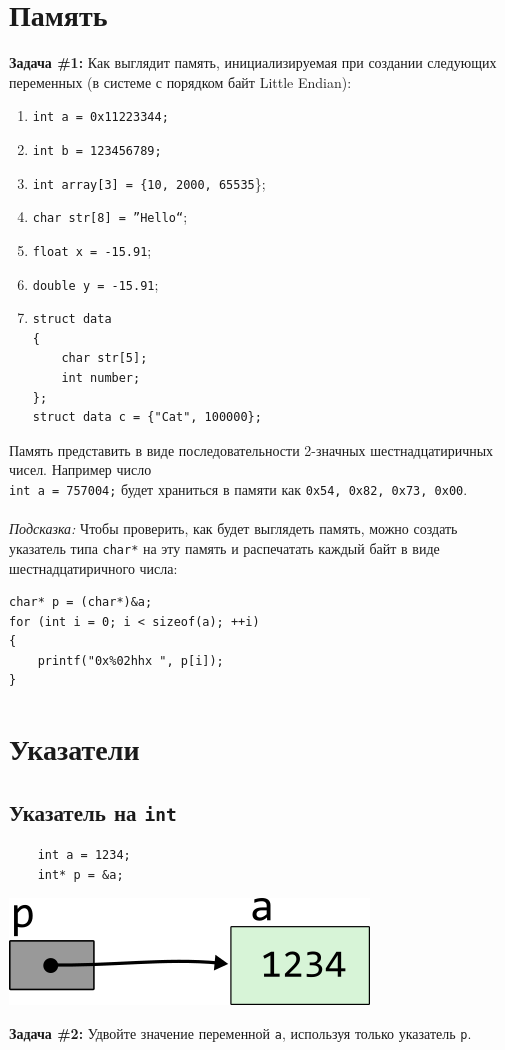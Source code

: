 \documentclass{article}
\begin{document}
\section*{Память}
\textbf{Задача \#1:} Как выглядит память, инициализируемая при создании следующих переменных (в системе с порядком байт Little Endian):
\begin{multicols}{2}
\begin{enumerate}
\item \texttt{int a = 0x11223344;}
\item \texttt{int b = 123456789;}
\item \texttt{int array[3] = \{10, 2000, 65535}\};
\item \texttt{char str[8] = ''Hello``};
\item \texttt{float x = -15.91};
\item \texttt{double y = -15.91};
\item
\begin{verbatim}
struct data
{
    char str[5];
    int number;
};
struct data c = {"Cat", 100000};
\end{verbatim}
\end{enumerate}
\end{multicols}
Память представить в виде последовательности 2-значных шестнадцатиричных чисел. Например число \\
\texttt{int a = 757004;} будет храниться в памяти как \texttt{0x54, 0x82, 0x73, 0x00}. \\ \\
\textit{Подсказка:} Чтобы проверить, как будет выглядеть память, можно создать указатель типа \texttt{char*} на эту память и распечатать каждый байт в виде шестнадцатиричного числа:
\begin{lstlisting}
char* p = (char*)&a;
for (int i = 0; i < sizeof(a); ++i)
{
    printf("0x%02hhx ", p[i]);
}
\end{lstlisting}

\section*{Указатели}

\subsection*{Указатель на \texttt{int}}
\begin{multicols}{2}
\begin{lstlisting}
	int a = 1234;
	int* p = &a;
\end{lstlisting}
\columnbreak
\begin{center}
\includegraphics[scale=1]{../../images/pointer_schemes/pointer_to_int.png}
\end{center}
\end{multicols}
\textbf{Задача \#2:} Удвойте значение переменной \texttt{a}, используя только указатель \texttt{p}.
\end{document}

